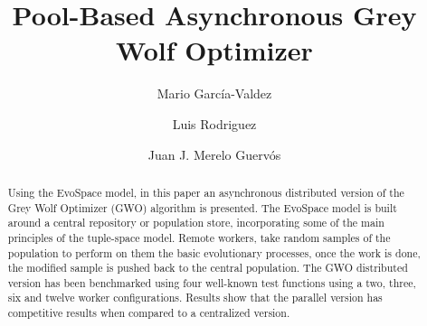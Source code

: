 \documentclass{llncs}
\begin{document}
\sloppy

\title{Pool-Based Asynchronous Grey Wolf Optimizer}

\author{Mario Garc\'ia-Valdez \and Luis Rodriguez \and Juan J. Merelo Guerv\'os}


\maketitle

\begin{abstract}
 

    Using the EvoSpace model, in this paper an asynchronous distributed version of 
    the Grey Wolf Optimizer (GWO) algorithm is presented. The EvoSpace model is
    built around a central repository or population store, incorporating some of 
    the main principles of the tuple-space model. Remote workers,
	take random samples of the population to perform on them the basic evolutionary
	processes, once the work is done, the modified sample is pushed back to the 
	central population. The GWO distributed version has been benchmarked using 
	four well-known test functions using a two, three, six and twelve worker configurations. 
	Results show that the parallel version has competitive results when compared 
	to a centralized version.   

	


	



\end{abstract}
\end{document}
